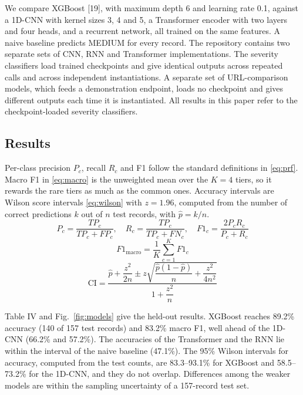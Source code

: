 \documentclass[10pt,twocolumn]{article}
\begin{document}
We compare XGBoost [19], with maximum depth 6 and learning rate 0.1, against a 1D-CNN with kernel sizes 3, 4 and 5, a Transformer encoder with two layers and four heads, and a recurrent network, all trained on the same features. A naive baseline predicts MEDIUM for every record. The repository contains two separate sets of CNN, RNN and Transformer implementations. The severity classifiers load trained checkpoints and give identical outputs across repeated calls and across independent instantiations. A separate set of URL-comparison models, which feeds a demonstration endpoint, loads no checkpoint and gives different outputs each time it is instantiated. All results in this paper refer to the checkpoint-loaded severity classifiers.

\subsection{Results}

Per-class precision $P_c$, recall $R_c$ and F1 follow the standard definitions in \eqref{eq:prf}. Macro F1 in \eqref{eq:macro} is the unweighted mean over the $K=4$ tiers, so it rewards the rare tiers as much as the common ones. Accuracy intervals are Wilson score intervals \eqref{eq:wilson} with $z=1.96$, computed from the number of correct predictions $k$ out of $n$ test records, with $\hat p=k/n$.
\begin{equation}
P_c=\frac{TP_c}{TP_c+FP_c},\quad R_c=\frac{TP_c}{TP_c+FN_c},\quad F1_c=\frac{2P_cR_c}{P_c+R_c}
\label{eq:prf}
\end{equation}
\begin{equation}
F1_{\text{macro}}=\frac{1}{K}\sum_{c=1}^{K}F1_c
\label{eq:macro}
\end{equation}
\begin{equation}
\mathrm{CI}=\frac{\hat p+\dfrac{z^2}{2n}\pm z\sqrt{\dfrac{\hat p(1-\hat p)}{n}+\dfrac{z^2}{4n^2}}}{1+\dfrac{z^2}{n}}
\label{eq:wilson}
\end{equation}

Table IV and Fig.~\ref{fig:models} give the held-out results. XGBoost reaches 89.2\% accuracy (140 of 157 test records) and 83.2\% macro F1, well ahead of the 1D-CNN (66.2\% and 57.2\%). The accuracies of the Transformer and the RNN lie within the interval of the naive baseline (47.1\%). The 95\% Wilson intervals for accuracy, computed from the test counts, are 83.3--93.1\% for XGBoost and 58.5--73.2\% for the 1D-CNN, and they do not overlap. Differences among the weaker models are within the sampling uncertainty of a 157-record test set.
\end{document}
